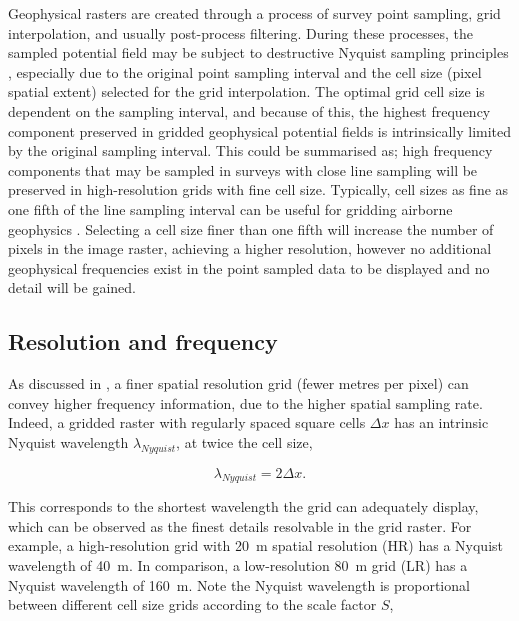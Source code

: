 Geophysical rasters are created through a process of survey point sampling, grid interpolation, and usually post-process filtering.
During these processes, the sampled potential field may be subject to destructive Nyquist sampling principles \parencite[26]{dentithGeophysicsMineralExploration2014}, especially due to the original point sampling interval and the cell size (pixel spatial extent) selected for the grid interpolation.
The optimal grid cell size is dependent on the sampling interval, and because of this, the highest frequency component preserved in gridded geophysical potential fields is intrinsically limited by the original sampling interval.
This could be summarised as; high frequency components that may be sampled in surveys with close line sampling will be preserved in high-resolution grids with fine cell size.
Typically, cell sizes as fine as one fifth of the line sampling interval can be useful for gridding airborne geophysics \parencite{reidAeromagneticSurveyDesign1980}.
Selecting a cell size finer than one fifth will increase the number of pixels in the image raster, achieving a higher resolution, however no additional geophysical frequencies exist in the point sampled data to be displayed and no detail will be gained.

\subsection{Resolution and frequency}
As discussed in , a finer spatial resolution grid (fewer metres per pixel) can convey higher frequency information, due to the higher spatial sampling rate.
Indeed, a gridded raster with regularly spaced square cells \(\Delta x\) has an intrinsic Nyquist wavelength \(\lambda_{Nyquist}\), at twice the cell size,

\begin{equation}
    \label{eqn:nyq}
    \lambda{}_{Nyquist} = 2 \Delta{}x.
\end{equation}

This corresponds to the shortest wavelength the grid can adequately display, which can be observed as the finest details resolvable in the grid raster.
For example, a high-resolution grid with \qty{20}{\metre} spatial resolution (HR) has a Nyquist wavelength of \qty{40}{\metre}.
In comparison, a low-resolution \qty{80}{\metre} grid (LR) has a Nyquist wavelength of \qty{160}{\metre}.
Note the Nyquist wavelength is proportional between different cell size grids according to the scale factor \(S\),


